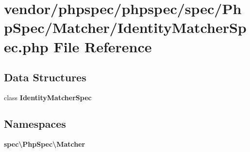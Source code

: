 \section{vendor/phpspec/phpspec/spec/\+Php\+Spec/\+Matcher/\+Identity\+Matcher\+Spec.php File Reference}
\label{_identity_matcher_spec_8php}
\subsection*{Data Structures}
\begin{DoxyCompactItemize}
\item 
class {\bf Identity\+Matcher\+Spec}
\end{DoxyCompactItemize}
\subsection*{Namespaces}
\begin{DoxyCompactItemize}
\item 
 {\bf spec\textbackslash{}\+Php\+Spec\textbackslash{}\+Matcher}
\end{DoxyCompactItemize}
